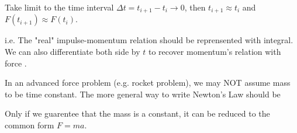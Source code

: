 \documentclass[class=article, crop=false, 12pt]{standalone}
\begin{document}
Take limit to the time interval $\Delta t = t_{i+1}-t_i \to 0$, then $t_{i+1}\approx t_i$ and $F(t_{i+1})\approx F(t_i)$.

i.e. The "real" impulse-momentum relation should be reprensented with integral.
We can also differentiate both side by $t$ to recover momentum's relation with force . 

In an advanced force problem (e.g. rocket problem), we may NOT assume mass to be time constant. 
The more general way to write Newton's  Law should be 

Only if we guarentee that the mass is a constant, it can be reduced to the common form $F=ma$.

\theend
\end{document}
